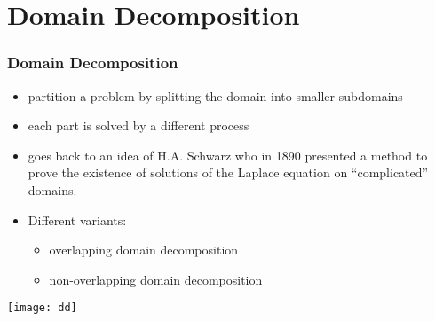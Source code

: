 \section{Domain Decomposition}
\begin{frame}
  \frametitle<presentation>{Domain Decomposition}

  \begin{itemize}
  \item partition a problem by splitting the domain into smaller subdomains
  \item each part is solved by a different process
  \item goes back to an idea of H.A. Schwarz who in 1890 presented a method to prove the existence of
        solutions of the Laplace equation on ``complicated'' domains.
  \item Different variants:
    \begin{itemize}
    \item overlapping domain decomposition
    \item non-overlapping domain decomposition
    \end{itemize}
  \end{itemize}

  \begin{center}
    \texttt{[image: dd]}
  \end{center}

\end{frame}

